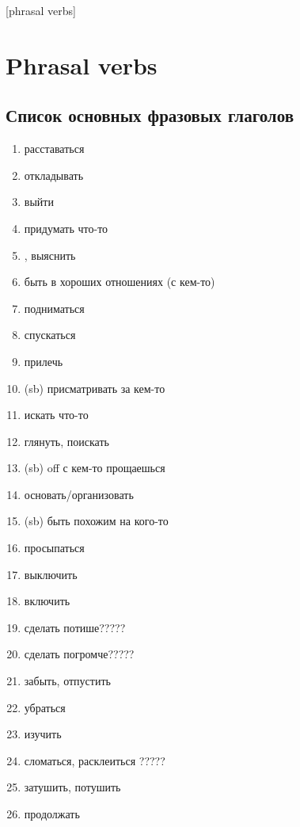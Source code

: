 [phrasal verbs]

\section{Phrasal verbs}
\subsection {Список основных фразовых глаголов}
\begin{enumerate}
    \item {} расставаться
    \item {} откладывать
    \item {} выйти
    \item {} придумать что-то
    \item {}, выяснить
    \item {} быть в хороших отношениях (с кем-то)
    \item {} подниматься
    \item {} спускаться
    \item {} прилечь
    \item {} (sb) присматривать за кем-то
    \item {} искать что-то
    \item {} глянуть, поискать
    \item {} (sb) off с кем-то прощаешься
    \item {} основать/организовать
    \item {} (sb) быть похожим на кого-то
    \item {} просыпаться
    \item {} выключить
    \item {} включить
    \item {} сделать потише?????
    \item {} сделать погромче?????
    \item {} забыть, отпустить
    \item {} убраться
    \item {} изучить
    \item {} сломаться, расклеиться ?????
    \item {} затушить, потушить
    \item {} продолжать

\end{enumerate}
